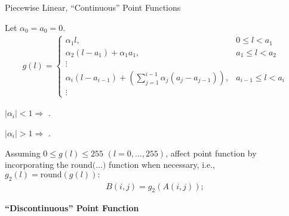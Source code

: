 %
%
\begin{slide}{Piecewise Linear, ``Continuous'' Point Functions}
\vspace*{-6pt}
\begin{titlelist}{}{}
\item<2-> 
Let $\alpha_0=a_0=0$.
\vspace{-6pt}
{\scriptsize
\begin{eqnarray}
g(l)=\left\{ \begin{array}{ll}
\alpha_1 l, & 0\leq l < a_1 \\
\alpha_2 (l-a_1)+ \alpha_1 a_1, & a_1 \leq l < a_2  \\
\vdots \\
\alpha_i (l-a_{i-1})+ (\sum_{j=1}^{i-1} \alpha_j (a_j-a_{j-1})), & a_{i-1}\leq l
< a_i \\
\vdots
\end{array}\right.
\end{eqnarray}
}
\item<3-> $|\alpha_i|<1 \Rightarrow$ .
\item<4-> $|\alpha_i|>1 \Rightarrow$ .

\item<5-> 
Assuming $0\leq g(l) \leq 255$ $(l=0,\ldots,255)$,
 affect point function by incorporating the $\mbox{round(\ldots)}$
 function when necessary, i.e.,
 $g_2(l)=\mbox{round}(g(l)):$
\vspace*{-3pt} 
{\scriptsize
\begin{eqnarray*}
B(i,j)=g_2(A(i,j));
\end{eqnarray*}
}
\vspace*{-18pt} 
\end{titlelist}

\end{slide}



%
%
\begin{slide}{} %
\centering\textbf{``Discontinuous'' Point Function}
\vspace*{-4pt}
\end{slide}

